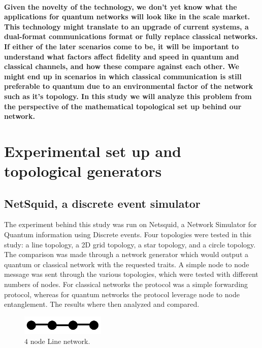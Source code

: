 \documentclass{article}
\begin{document}
    \paragraph{Given the novelty of the technology, we don't yet know what the applications for quantum networks will look like in the scale market. This technology might translate to an upgrade of current systems, a dual-format communications format or fully replace classical networks. 
    If either of the later scenarios come to be, it will be important to understand what factors affect fidelity and speed in quantum and classical channels, and how these compare against each other. We might end up in scenarios in which classical communication is still preferable to quantum due to an environmental factor of the network such as it's topology.
    In this study we will analyze this problem from the perspective of the mathematical topological set up behind our network.}


    \section{Experimental set up and topological generators}

    \subsection*{NetSquid, a discrete event simulator}
    The experiment behind this study was run on Netsquid\cite{Netsquid}, a Network Simulator for Quantum information using Discrete events.
    Four topologies were tested in this study: a line topology, a 2D grid topology, a star topology, and a circle topology. 
    The comparison was made through a network generator which would output a quantum or classical network with the requested traits.
    A simple node to node message was sent through the various topologies, which were tested with different numbers of nodes. 
    For classical networks the protocol was a simple forwarding protocol, whereas for quantum networks the protocol leverage node to node entanglement.
    The results where then analyzed and compared.
    

    \begin{figure}
    \centering
    \includegraphics[width=4cm]{Line.png}
    \caption{\label{f1} $4$ node Line network.} 
    \end{figure}
\end{document}
